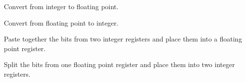 \begin{description}

\item {}

	Convert from integer to floating point.

\item {}

	Convert from floating point to integer.

\item {}

	Paste together the bits from two integer registers and place
	them into a floating point register.

\item {}

	Split the bits from one floating point register and place them
	into two integer registers.

\end{description}


